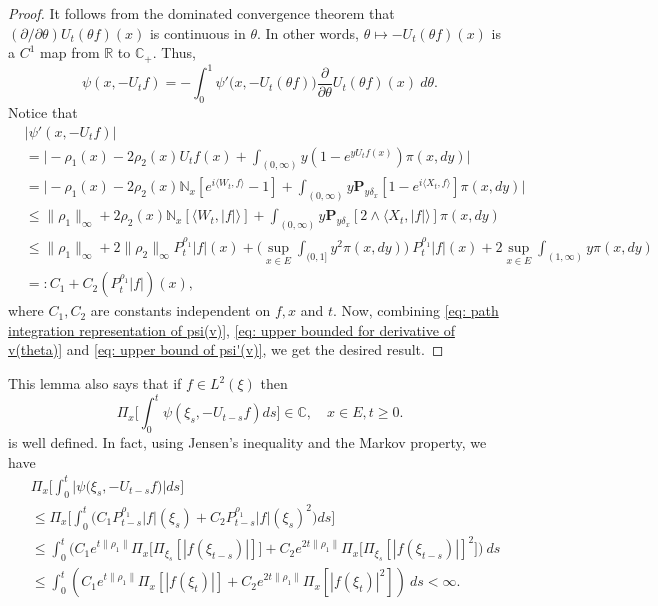 \documentclass[12pt,a4paper]{amsart}
\theoremstyle{plain}
\theoremstyle{definition}
\numberwithin{equation}{section}
\begin{document}
\begin{proof}
    It follows from the dominated convergence theorem that $(\partial/\partial \theta)U_t(\theta f)(x)$ is continuous in $\theta$.
    In other words, $\theta \mapsto -U_t(\theta f)(x)$ is a $C^1$ map from $\mathbb R$ to $\mathbb C_+$.
    Thus,
\begin{equation}
\label{eq: path integration representation of psi(v)}
    \psi(x,-U_tf)
    = -\int_0^1 \psi'\big(x,-U_t(\theta f)\big) \frac{\partial}{\partial \theta} U_t(\theta f)(x)~d\theta.
\end{equation}
    Notice that
\begin{align}
\label{eq: upper bound of psi'(v)}
    &|\psi'(x, -U_tf)|
    \\&= \Big| -\rho_1(x)- 2\rho_2(x) U_tf(x)+ \int_{(0,\infty)} y (1- e^{y U_tf(x)} ) \pi(x,dy)\Big|
    \\&= \Big| - \rho_1(x)- 2\rho_2(x)\mathbb N_x[e^{i \langle W_t, f\rangle} - 1]  + \int_{(0,\infty)} y \mathbf P_{y \delta_x}[1-e^{i \langle X_t, f\rangle}] \pi(x,dy) \Big|
    \\ &\leq \|\rho_1\|_\infty + 2\rho_2(x)\mathbb N_x[\langle W_t, |f|\rangle]+ \int_{(0,\infty)} y\mathbf P_{y\delta_x}[2\wedge \langle X_t, |f|\rangle] \pi(x,dy)
    \\ &\leq \|\rho_1\|_\infty + 2\|\rho_2\|_\infty
    P^{\rho_1}_t |f|(x) + \Big(\sup_{x\in E}\int_{(0,1]}y^2 \pi(x,dy)\Big)~P^{\rho_1}_t |f|(x) + 2\sup_{x\in E}\int_{(1,\infty)} y \pi(x,dy)
    \\ &=: C_1 + C_2(P^{\rho_1}_t |f|)(x),
\end{align}
    where $C_1, C_2$ are constants independent on $f,x$ and $t$.
    Now, combining \eqref{eq: path integration representation of psi(v)}, \eqref{eq: upper bounded for derivative of v(theta)} and \eqref{eq: upper bound of psi'(v)}, we get the desired result.
\end{proof}

    This lemma also says that if $f\in L^2(\xi)$ then
\[
    \Pi_x\Big[\int_0^t \psi(\xi_s,- U_{t-s}f)ds\Big]
    \in \mathbb C,
    \quad x\in E, t\geq 0.
\]
    is well defined.
    In fact, using Jensen's inequality and the Markov property, we have
\begin{align}
\label{eq: domination of psi(v)}
    &\Pi_x\Big[\int_0^t \big|\psi \big(\xi_s,-U_{t-s}f\big)\big|ds\Big]
    \\&\leq \Pi_x\Big[\int_0^t \big(C_1 P_{t-s}^{\rho_1}|f|(\xi_s)+C_2 P_{t-s}^{\rho_1}|f|(\xi_s)^2\big)ds\Big]
    \\ &\leq \int_0^t \big(C_1 e^{t\|\rho_1\|}\Pi_x \big[ \Pi_{\xi_s}[|f(\xi_{t-s})|] \big]+C_2 e^{2t\|\rho_1\|}\Pi_x \big[ \Pi_{\xi_s}[|f (\xi_{t-s})|]^2 \big]\big)~ds
    \\ &\leq \int_0^t (C_1 e^{t\|\rho_1\|}\Pi_x [ |f(\xi_{t})|]+C_2e^{2t\|\rho_1\|}\Pi_x [ |f (\xi_{t})|^2 ])~ds < \infty.
\end{align}
\end{document}
